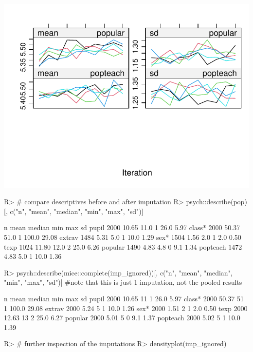 \documentclass[
]{jss}
\begin{document}
\begin{CodeChunk}
\begin{center}\includegraphics{Manuscript_files/figure-latex/pop-ignored-2} \end{center}

\begin{CodeInput}
R> # compare descriptives before and after imputation
R> psych::describe(pop)[, c("n", "mean", "median", "min", "max", "sd")]
\end{CodeInput}
\begin{CodeOutput}
            n  mean median min   max    sd
pupil    2000 10.65   11.0   1  26.0  5.97
class*   2000 50.37   51.0   1 100.0 29.08
extrav   1484  5.31    5.0   1  10.0  1.29
sex*     1504  1.56    2.0   1   2.0  0.50
texp     1024 11.80   12.0   2  25.0  6.26
popular  1490  4.83    4.8   0   9.1  1.34
popteach 1472  4.83    5.0   1  10.0  1.36
\end{CodeOutput}
\begin{CodeInput}
R> psych::describe(mice::complete(imp_ignored))[, c("n", "mean", "median", "min", "max", "sd")] #note that this is just 1 imputation, not the pooled results
\end{CodeInput}
\begin{CodeOutput}
            n  mean median min   max    sd
pupil    2000 10.65     11   1  26.0  5.97
class*   2000 50.37     51   1 100.0 29.08
extrav   2000  5.24      5   1  10.0  1.26
sex*     2000  1.51      2   1   2.0  0.50
texp     2000 12.63     13   2  25.0  6.27
popular  2000  5.01      5   0   9.1  1.37
popteach 2000  5.02      5   1  10.0  1.39
\end{CodeOutput}
\begin{CodeInput}
R> # further inspection of the imputations
R> densityplot(imp_ignored)
\end{CodeInput}



\end{CodeChunk}
\end{document}
